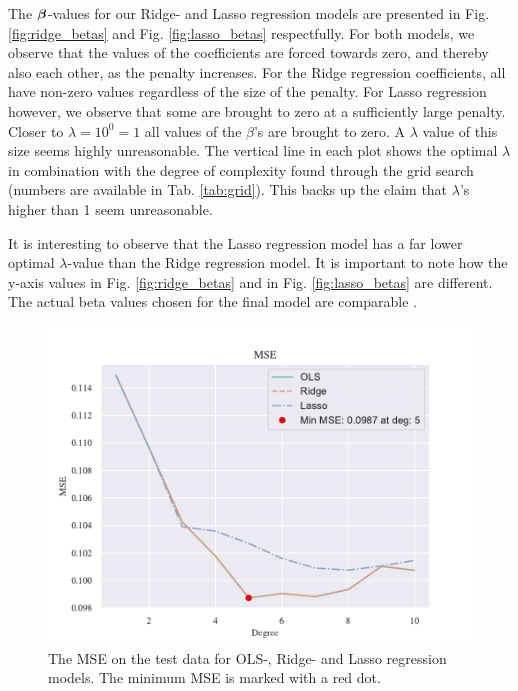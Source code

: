 The $\boldsymbol{\beta}$-values for our Ridge- and Lasso regression models are presented in Fig. \ref{fig:ridge_betas} and Fig. \ref{fig:lasso_betas} respectfully. For both models, we observe that the values of the coefficients are forced towards zero, and thereby also each other, as the penalty increases. For the Ridge regression coefficients, all have non-zero values regardless of the size of the penalty. For Lasso regression however, we observe that some are brought to zero at a sufficiently large penalty. Closer to $\lambda = 10^0 = 1$ all values of the $\beta$'s are brought to zero. A $\lambda$ value of this size seems highly unreasonable. 
The vertical line in each plot shows the optimal $\lambda$ in combination with the degree of complexity found through the grid search (numbers are available in Tab. \ref{tab:grid}). This backs up the claim that $\lambda$'s higher than 1 seem unreasonable. 

It is interesting to observe that the Lasso regression model has a far lower optimal $\lambda$-value than the Ridge regression model. It is important to note how the y-axis values in Fig. \ref{fig:ridge_betas} and in Fig. \ref{fig:lasso_betas} are different. The actual beta values chosen for the final model are comparable . 

\begin{figure}[h!]
    \centering
    \includegraphics[width=1\linewidth]{project_1_alt/figures/figures_in_report/OLS_Ridge_Lasso_Franke_Noise.pdf}
    \caption{The MSE on the test data for OLS-, Ridge- and Lasso regression models. The minimum MSE is marked with a red dot.}
    \label{all3franke}
\end{figure}

